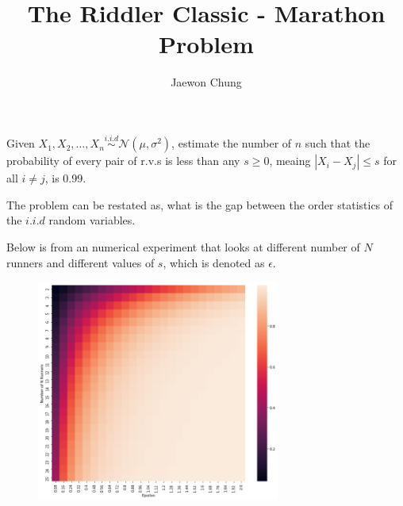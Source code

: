 \documentclass[12pt]{article}
\newenvironment{solution}[2][Solution]{\begin{trivlist}
\item[\hskip \labelsep {\bfseries #1}]}{\end{trivlist}}
\newenvironment{problem}[2][Problem]{\begin{trivlist}
\item[\hskip \labelsep {\bfseries #1}\hskip \labelsep {\bfseries #2.}]}{\end{trivlist}}
\begin{document}

\title{The Riddler Classic - Marathon Problem}%
\author{Jaewon Chung %
} %

\maketitle
\begin{problem}{(\href{https://fivethirtyeight.com/features/how-hard-is-it-to-find-a-running-buddy/}{538 Link})}
Given $X_1, X_2, \ldots, X_n \stackrel{i.i.d}{\sim} \mathcal{N}(\mu, \sigma^2)$, estimate the number of $n$ such
that the probability of every pair of r.v.s is less than any $s \geq 0$, 
meaing $|X_i - X_j| \leq s$ for all $i\neq j$, is 0.99.
\end{problem}

\begin{solution}{}
    The problem can be restated as, what is the gap between the order statistics of the $i.i.d$ random variables.

    Below is from an numerical experiment that looks
    at different number of $N$ runners and different values
    of $s$, which is denoted as $\epsilon$.
    \begin{figure}[h]
    \centering
    \includegraphics[width=8cm]{heatmap_plot.png}
    \end{figure}
\end{solution}
\end{document}
